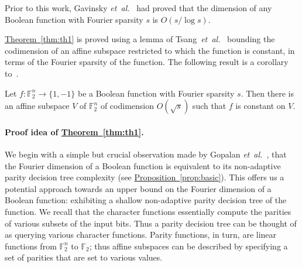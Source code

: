 \documentclass{toc}
\newcommand{\etal}{{\it et~al.}}
\newcommand{\lref}[2][]{\hyperref[#2]{#1~\ref*{#2}}}
\newcommand{\F}{{\mathbb F}}
\begin{document}
Prior to this work, Gavinsky \etal~\cite{alex} had proved that the dimension of any Boolean function with Fourier sparsity $s$ is $O(s/\log s)$.

\lref[Theorem]{thm:th1} is proved using a lemma of
Tsang~\etal~\cite{tsang} bounding the codimension of an affine subspace
restricted to which the function is constant, in terms of the
Fourier sparsity of the function.
%
The following result is a corollary to~\cite[Lemma~28]{tsang}.
%
\begin{lemma}
\label{lem:set}
Let $f:\mathbb{F}_2^n \rightarrow \{1,-1\}$ be a Boolean function
with Fourier sparsity $s$. Then there is an affine subspace $V$ of $\mathbb{F}_2^n$ of codimension $O(\sqrt{s})$ such
that $f$ is constant on $V$.
\end{lemma}
%
\paragraph{Proof idea of \lref[Theorem]{thm:th1}.}
%
We begin
%
with  %
a simple but crucial
observation made by Gopalan \etal~\cite{DBLP:journals/siamcomp/GopalanOSSW11}, that the Fourier dimension of a Boolean function is
equivalent to its non-adaptive parity decision tree complexity (see
\lref[Proposition]{prop:basic}). This offers us a potential approach
towards
%
an upper bound on  %
the Fourier dimension of a Boolean function:
exhibiting a shallow non-adaptive parity decision tree of the
function. We recall that the character functions essentially compute the parities of various subsets of the input bits. Thus a parity decision tree can be thought of as querying various character functions. Parity functions, in turn, are linear functions from $\F_2^n$ to $\F_2$; thus affine subspaces can be described by specifying a set of parities that are set to various values.
\end{document}
